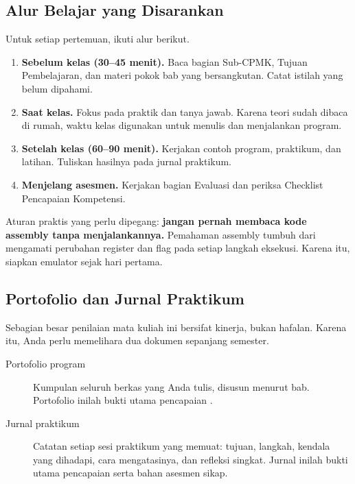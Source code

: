 \subsection{Alur Belajar yang Disarankan}

Untuk setiap pertemuan, ikuti alur berikut.

\begin{enumerate}
    \item \textbf{Sebelum kelas (30--45 menit).} Baca bagian
          Sub-CPMK, Tujuan Pembelajaran, dan materi pokok bab yang
          bersangkutan. Catat istilah yang belum dipahami.
    \item \textbf{Saat kelas.} Fokus pada praktik dan tanya jawab.
          Karena teori sudah dibaca di rumah, waktu kelas digunakan
          untuk menulis dan menjalankan program.
    \item \textbf{Setelah kelas (60--90 menit).} Kerjakan contoh
          program, praktikum, dan latihan. Tuliskan hasilnya pada
          jurnal praktikum.
    \item \textbf{Menjelang asesmen.} Kerjakan bagian Evaluasi dan
          periksa Checklist Pencapaian Kompetensi.
\end{enumerate}

\begin{aktivitasbox}
Aturan praktis yang perlu dipegang: \textbf{jangan pernah membaca
kode assembly tanpa menjalankannya.} Pemahaman assembly tumbuh dari
mengamati perubahan register dan flag pada setiap langkah eksekusi.
Karena itu, siapkan emulator sejak hari pertama.
\end{aktivitasbox}

\subsection{Portofolio dan Jurnal Praktikum}

Sebagian besar penilaian mata kuliah ini bersifat kinerja, bukan
hafalan. Karena itu, Anda perlu memelihara dua dokumen sepanjang
semester.

\begin{description}
    \item[Portofolio program] Kumpulan seluruh berkas
           yang Anda tulis, disusun menurut bab. Portofolio
          inilah bukti utama pencapaian .

    \item[Jurnal praktikum] Catatan setiap sesi praktikum yang
          memuat: tujuan, langkah, kendala yang dihadapi, cara
          mengatasinya, dan refleksi singkat. Jurnal inilah bukti
          utama pencapaian  serta bahan asesmen sikap.
\end{description}

